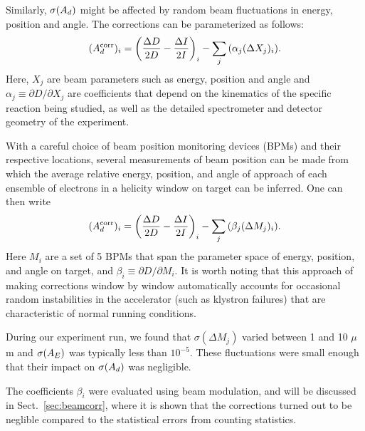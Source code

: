 Similarly, $\sigma(A_d)$ might be affected by random beam
fluctuations in energy, position and angle. The corrections can be
parameterized as follows:
\begin{equation}
(A^{\rm corr}_d)_i = \left(\frac{\Delta D}{2D} - \frac{\Delta I}{2I}\right)_i
-\sum_j{\left( {\alpha_j(\Delta X_j)_i}\right)}.
\end{equation}
Here, $X_j$ are beam parameters such as energy, position and
angle and $\alpha_j \equiv \partial D/\partial X_j$ are
coefficients that depend on the kinematics of the specific
reaction being studied, as well as the detailed spectrometer and
detector geometry of the experiment.

With a careful choice of beam position monitoring devices (BPMs) 
and their respective locations, several measurements of beam
position can be made from which the average relative energy,
position, and angle of approach of each ensemble of electrons in a
helicity window on target can be inferred. One can then write
\begin{equation} 
(A^{\rm corr}_d)_i = \left(\frac{\Delta D}{2D} - \frac{\Delta I}{2I}\right)_i
-\sum_j{\left({\beta_j(\Delta M_j)_i}\right)}.
\end{equation}
Here $M_i$ are a set of 5 BPMs that span the parameter space of
energy, position, and angle on target, and $\beta_i \equiv \partial
D/\partial M_i$. It is worth noting that this approach of making
corrections window by window automatically accounts for occasional
random instabilities in the accelerator (such as klystron
failures) that are characteristic of normal running conditions.

During our experiment run, we found that $\sigma(\Delta M_j)$ varied
between 1 and 10 $\mu$m and $\sigma (A_E)$ was typically less
than $10^{-5}$. These fluctuations were small enough that their
impact on $\sigma (A_d)$ was negligible. 

The coefficients $\beta_i$ were evaluated using beam modulation, and will be
discussed in Sect.~\ref{sec:beamcorr}, where it is shown that the 
corrections turned out to be neglible compared to the statistical 
errors from counting statistics.




